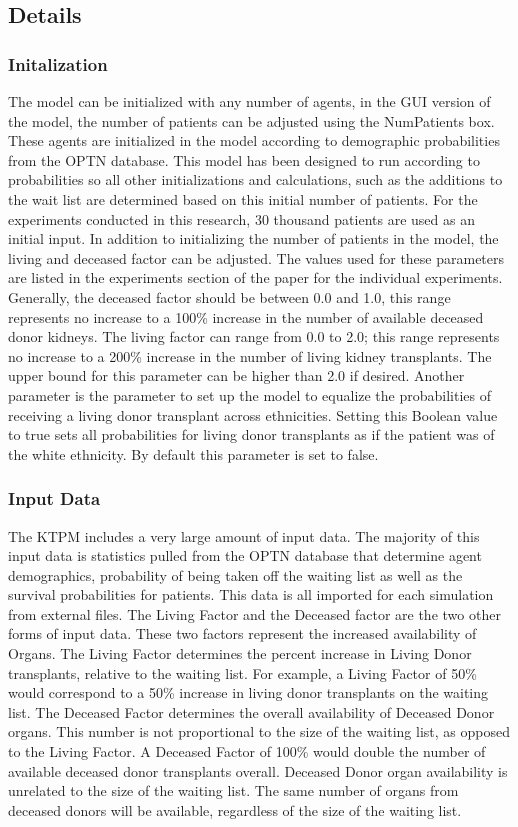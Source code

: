 \documentclass[9pt,a4paper,twocolumn]{scrartcl}
\begin{document}
\subsection{Details}
\subsubsection{Initalization}
The model can be initialized with any number of agents, in the GUI version of the model, the number of patients can be adjusted using the NumPatients box.  These agents are initialized in the model according to demographic probabilities from the OPTN database.  This model has been designed to run according to probabilities so all other initializations and calculations, such as the additions to the wait list are determined based on this initial number of patients.  For the experiments conducted in this research, 30 thousand patients are used as an initial input.
In addition to initializing the number of patients in the model, the living and deceased factor can be adjusted.  The values used for these parameters are listed in the experiments section of the paper for the individual experiments.  Generally, the deceased factor should be between 0.0 and 1.0, this range represents no increase to a 100\% increase in the number of available deceased donor kidneys.  The living factor can range from 0.0 to 2.0; this range represents no increase to a 200\% increase in the number of living kidney transplants.  The upper bound for this parameter can be higher than 2.0 if desired.   
Another parameter is the parameter to set up the model to equalize the probabilities of receiving a living donor transplant across ethnicities.  Setting this Boolean value to true sets all probabilities for living donor transplants as if the patient was of the white ethnicity.  By default this parameter is set to false.

\subsubsection{Input Data}
The KTPM includes a very large amount of input data.  The majority of this input data is statistics pulled from the OPTN database that determine agent demographics, probability of being taken off the waiting list as well as the survival probabilities for patients.  This data is all imported for each simulation from external files. 
The Living Factor and the Deceased factor are the two other forms of input data.  These two factors represent the increased availability of Organs.  The Living Factor determines the percent increase in Living Donor transplants, relative to the waiting list.  For example, a Living Factor of 50\% would correspond to a 50\% increase in living donor transplants on the waiting list.  The Deceased Factor determines the overall availability of Deceased Donor organs.  This number is not proportional to the size of the waiting list, as opposed to the Living Factor.  A Deceased Factor of 100\% would double the number of available deceased donor transplants overall.  Deceased Donor organ availability is unrelated to the size of the waiting list.  The same number of organs from deceased donors will be available, regardless of the size of the waiting list.
\end{document}
